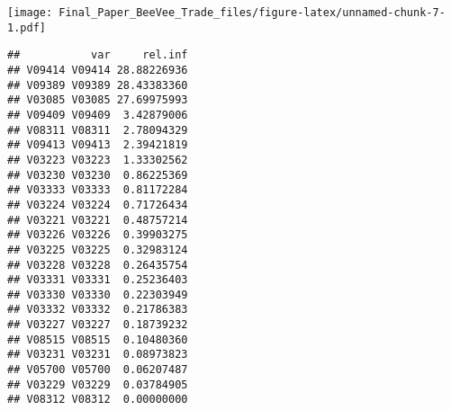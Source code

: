 \documentclass[]{article}
\newenvironment{Shaded}{\begin{snugshade}}{\end{snugshade}}
\newcommand{\KeywordTok}[1]{\textcolor[rgb]{0.13,0.29,0.53}{\textbf{#1}}}
\newcommand{\DataTypeTok}[1]{\textcolor[rgb]{0.13,0.29,0.53}{#1}}
\newcommand{\DecValTok}[1]{\textcolor[rgb]{0.00,0.00,0.81}{#1}}
\newcommand{\FloatTok}[1]{\textcolor[rgb]{0.00,0.00,0.81}{#1}}
\newcommand{\StringTok}[1]{\textcolor[rgb]{0.31,0.60,0.02}{#1}}
\newcommand{\CommentTok}[1]{\textcolor[rgb]{0.56,0.35,0.01}{\textit{#1}}}
\newcommand{\OperatorTok}[1]{\textcolor[rgb]{0.81,0.36,0.00}{\textbf{#1}}}
\newcommand{\NormalTok}[1]{#1}
\begin{document}
\begin{Shaded}
\end{Shaded}

\texttt{[image: Final\_Paper\_BeeVee\_Trade\_files/figure-latex/unnamed-chunk-7-1.pdf]}

\begin{verbatim}
##           var     rel.inf
## V09414 V09414 28.88226936
## V09389 V09389 28.43383360
## V03085 V03085 27.69975993
## V09409 V09409  3.42879006
## V08311 V08311  2.78094329
## V09413 V09413  2.39421819
## V03223 V03223  1.33302562
## V03230 V03230  0.86225369
## V03333 V03333  0.81172284
## V03224 V03224  0.71726434
## V03221 V03221  0.48757214
## V03226 V03226  0.39903275
## V03225 V03225  0.32983124
## V03228 V03228  0.26435754
## V03331 V03331  0.25236403
## V03330 V03330  0.22303949
## V03332 V03332  0.21786383
## V03227 V03227  0.18739232
## V08515 V08515  0.10480360
## V03231 V03231  0.08973823
## V05700 V05700  0.06207487
## V03229 V03229  0.03784905
## V08312 V08312  0.00000000
\end{verbatim}
\end{document}

